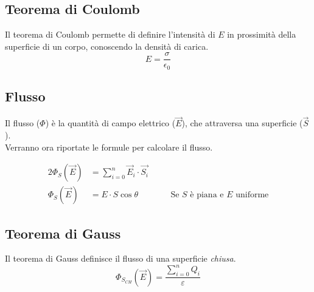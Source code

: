 \subsection{Teorema di Coulomb}
Il teorema di Coulomb permette di definire l'intensità di $E$ in prossimità della superficie di un
corpo, conoscendo la densità di carica.
\begin{equation*}
  E = \frac{\sigma}{\epsilon_0}
\end{equation*}

\subsection{Flusso} \label{subsec:flusso}
Il flusso ($\Phi$) è la quantità di campo elettrico ($\vec{E}$), che 
attraversa una superficie ($\vec{S}$).\\
Verranno ora riportate le formule per calcolare il flusso.

\begin{alignat*}{2}
  \Phi_S\left(\vec{E}\right) &= \sum\limits_{i=0}^{n}\vec{E}_i\cdot\vec{S_i} &\quad &\\
  \Phi_S\left(\vec{E}\right) &= E\cdot S\cos\theta & &\text{Se } S \text{ è piana e } E \text{ 
  uniforme} 
\end{alignat*}
\begin{center}
\end{center}

\subsection{Teorema di Gauss}
Il teorema di Gauss definisce il flusso di una superficie \emph{chiusa}.
\begin{equation*}
  \Phi_{S_{CH}}\left(\vec{E}\right) = \frac{\sum\limits_{i=0}^{n}Q_i}{\varepsilon}
\end{equation*}


